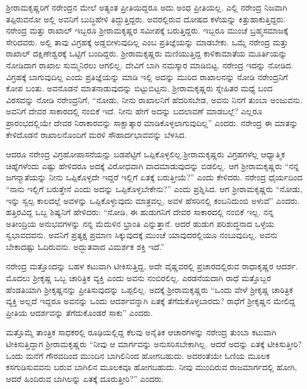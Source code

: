 ಶ‍್ರೀರಾಮಕೃಷ್ಣರಿಗೆ ನರೇಂದ್ರನ ಮೇಲೆ ಅತ್ಯಂತ ಪ್ರೀತಿಯಿದ್ದರೂ ಅದು ಅಂಧ ಪ್ರೀತಿಯಲ್ಲ. ಎಲ್ಲಿ ನರೇಂದ್ರ ನಿಜವಾಗಿ ತಪ್ಪಿರುವನೋ ಅಲ್ಲಿ ಅವನಿಗೆ ಬುದ್ಧಿಹೇಳಿ ತಿದ್ದುತ್ತಿದ್ದರು. ಅವರಲ್ಲಿರುವ ದೋಷದ ಕಳೆಯನ್ನು ಕಿತ್ತುಹಾಕುತ್ತಿದ್ದರು. ನರೇಂದ್ರ ಮತ್ತು ರಾಖಾಲ್ ಇಬ್ಬರೂ ಶ‍್ರೀರಾಮಕೃಷ್ಣರ ಸಮೀಪಕ್ಕೆ ಬರುತ್ತಿದ್ದರು. ಇಬ್ಬರೂ ಮುಂಚೆ ಬ್ರಹ್ಮಸಮಾಜಕ್ಕೆ ಸೇರಿದವರು. ಅಲ್ಲಿ ತಾವು ವಿಗ್ರಹಕ್ಕೆ ಅಡ್ಡಬೀಳುವುದಿಲ್ಲ ಎಂಬ ಪ್ರತಿಜ್ಞೆಯನ್ನು ಮಾಡಬೇಕು. ಒಮ್ಮೆ ನರೇಂದ್ರ ಮತ್ತು ರಾಖಾಲ್ ದಕ್ಷಿಣೇಶ್ವರಕ್ಕೆ ಒಟ್ಟಿಗೆ ಬಂದಿದ್ದರು. ಶ‍್ರೀರಾಮಕೃಷ್ಣರು ಮಣಿಯುತ್ತಿದ್ದ ಕಾಳಿಕಾಮಾತೆಯ ಮೂರ್ತಿಯನ್ನು ನೋಡಿದಾಗ ರಾಖಾಲ ಸುಮ್ಮನಿರಲು ಆಗಲಿಲ್ಲ. ದೇವಿಗೆ ಬಾಗಿ ನಮಸ್ಕಾರ ಮಾಡಿಬಿಟ್ಟ. ನರೇಂದ್ರ ಇದನ್ನು ನೋಡಿದ. ವಿಗ್ರಹಕ್ಕೆ ಬಾಗುವುದಿಲ್ಲ ಎಂದು ಪ್ರತಿಜ್ಞೆಯನ್ನು ಮಾಡಿ ಇಲ್ಲಿ ಅದನ್ನು ಮುರಿದ ರಾಖಾಲನನ್ನು ನೋಡಿ ನರೇಂದ್ರನಿಗೆ ಕೋಪ ಬಂತು. ಅವನೊಡನೆ ಮಾತನಾಡುವುದನ್ನು ಬಿಟ್ಟುಬಿಟ್ಟನು. ಶ‍್ರೀರಾಮಕೃಷ್ಣರು ಸ್ನೇಹಿತರ ಮಧ್ಯೆ ಬಂದ ವಿರಸವನ್ನು ನೋಡಿ ನರೇಂದ್ರನಿಗೆ, “ನೋಡು, ನೀನು ರಾಖಾಲನಿಗೆ ಹೆದರಿಸಬೇಡ, ಅವನು ನಿನಗೆ ತುಂಬಾ ಅಂಜುವನು. ಅವನಿಗೆ ದೇವರ ಸಾಕಾರದಲ್ಲಿ ನಂಬಿಕೆ ಇದೆ. ನೀನು ಹೇಗೆ ಅದನ್ನು ಬದಲಾವಣೆ ಮಾಡಬಲ್ಲೆ? ಎಲ್ಲರೂ ಪ್ರಾರಂಭದಲ್ಲಿಯೇ ದೇವರ ನಿರಾಕಾರವನ್ನು ಸಾಕ್ಷಾತ್ಕಾರ ಮಾಡಿಕೊಳ್ಳಲಾಗುವುದಿಲ್ಲ” ಎಂದರು. ನರೇಂದ್ರ ಈ ಮಾತನ್ನು ಕೇಳಿದೊಡನೆ ರಾಖಾಲನೊಂದಿಗೆ ಮರಳಿ ಸೌಹಾರ್ದಭಾವವನ್ನು ಬೆಳಸಿದ.

ಆದರೂ ನರೇಂದ್ರ ವಿಗ್ರಹೋಪಾಸನೆಯನ್ನು ಬಡಪೆಟ್ಟಿಗೆ ಒಪ್ಪಿಕೊಳ್ಳಲಿಲ್ಲ.\break ಶ‍್ರೀರಾಮಕೃಷ್ಣರು ವಿಗ್ರಹಗಳೆಲ್ಲ ಆಧ್ಯಾತ್ಮಿಕ ಚಿಹ್ನೆಗಳೆಂದು ಎಷ್ಟು ಹೇಳಿದರೂ ಅದಕ್ಕೆ ವಿರೋಧವಾಗಿ ವಾದಮಾಡುವುದನ್ನು ಬಿಡಲಿಲ್ಲ. ಆಗ ಶ‍್ರೀರಾಮಕೃಷ್ಣರು “ನನ್ನ ಜಗನ್ಮಾತೆಯನ್ನು ನೀನು ಒಪ್ಪಿಕೊಳ್ಳದೇ ಇದ್ದರೆ ಇಲ್ಲಿಗೆ ಏತಕ್ಕೆ ಬರುತ್ತೀಯೆ?” ಎಂದು ಕೇಳಿದರು. ನರೇಂದ್ರ ಧೈರ್ಯದಿಂದ “ನಾನು ಇಲ್ಲಿಗೆ ಬರುತ್ತೇನೆ ಎಂದು ಅದನ್ನು ಒಪ್ಪಿಕೊಳ್ಳಬೇಕೇನು?” ಎಂದು ಪ್ರಶ್ನಿಸಿದ. ಆಗ ಶ‍್ರೀರಾಮಕೃಷ್ಣರು “ನೋಡು, ಇನ್ನು ಸ್ವಲ್ಪ ಕಾಲದಲ್ಲೆ ಅವಳನ್ನು ಒಪ್ಪಿಕೊಳ್ಳುವುದು ಮಾತ್ರವಲ್ಲ, ಅವಳ ಹೆಸರಿನಲ್ಲಿ ಕಂಬನಿದುಂಬಿ ಅಳುವೆ” ಎಂದರು. ಹತ್ತಿರವಿದ್ದ ಒಬ್ಬ ಶಿಷ್ಯನಿಗೆ ಹೇಳಿದರು: “ನೋಡಿ, ಈ ಹುಡುಗನಿಗೆ ದೇವರ ಸಾಕಾರದಲ್ಲಿ ನಂಬಿಕೆ ಇಲ್ಲ. ನನ್ನ ಅತೀಂದ್ರಿಯ ಅನುಭವಗಳನ್ನು ನನ್ನ ಮೆದುಳಿನ ಭ್ರಾಂತಿ ಎನ್ನುತ್ತಾನೆ. ಆದರೆ ಹುಡುಗ ಪರಿಶುದ್ಧನಾದ ಒಳ್ಳೆಯ ಸ್ವಭಾವದವನು. ಅವನಿಗೆ ಪ್ರತ್ಯಕ್ಷ ಪ್ರಮಾಣ ಸಿಕ್ಕುವುದಕ್ಕೆ ಮುಂಚೆ ಯಾವುದರಲ್ಲಿಯೂ ನಂಬುವುದಿಲ್ಲ. ಅವನು ಬೇಕಾದಷ್ಟು ಓದಿರುವನು. ಅದ್ಭುತವಾದ ವಿಮರ್ಶಕ ಶಕ್ತಿ ಇದೆ.”

ನರೇಂದ್ರ ಮತ್ತೊಂದನ್ನು ಬಹಳ ಕಟುವಾಗಿ ಟೀಕಿಸುತ್ತಿದ್ದ, ಅದೇ ವೈಷ್ಣವರಲ್ಲಿ ಪ್ರಚಾರದಲ್ಲಿರುವ ರಾಧಾಕೃಷ್ಣರ ಆದರ್ಶ. ಮೊದಲು ಶ‍್ರೀಕೃಷ್ಣ ಒಬ್ಬ ಚಾರಿತ್ರಿಕ ವ್ಯಕ್ತಿ ಎಂದು ಅವನು ನಂಬಿರಲಿಲ್ಲ. ಎರಡನೆಯದಾಗಿ ರಾಧೆ ಮತ್ತೊಬ್ಬರ ಹೆಂಡತಿಯಾಗಿ ಶ‍್ರೀಕೃಷ್ಣನನ್ನು ಪ್ರೀತಿಸುವುದನ್ನು ಒಪ್ಪಲಿಲ್ಲ. ಅದಕ್ಕೆ ಶ‍್ರೀರಾಮಕೃಷ್ಣರು “ಒಂದು ವೇಳೆ ಶ‍್ರೀಕೃಷ್ಣ ಚಾರಿತ್ರಿಕ ವ್ಯಕ್ತಿ ಅಲ್ಲದೆ ಇದ್ದರೂ ಅವನನ್ನು ಒಂದು ಆದರ್ಶವನ್ನಾಗಿ ಏತಕ್ಕೆ ತೆಗೆದುಕೊಳ್ಳಬಾರದು? ರಾಧೆಗೆ ಶ‍್ರೀಕೃಷ್ಣನ ಮೇಲಿದ್ದ ಪ್ರೀತಿಯ ಆದರ್ಶವನ್ನು ತೆಗೆದುಕೊಂಡರೆ ಸಾಕು” ಎಂದರು.

ಮತ್ತೊಮ್ಮೆ ತಾಂತ್ರಿಕ ಸಾಧಕರಲ್ಲಿ ರೂಢಿಯಲ್ಲಿದ್ದ ಕೆಲವು ಅನೈತಿಕ ಆಚಾರಗಳನ್ನು ನರೇಂದ್ರ ತುಂಬಾ ಕಟುವಾಗಿ ಟೀಕಿಸುತ್ತಿದ್ದಾಗ ಶ‍್ರೀರಾಮಕೃಷ್ಣರು “ನೀವು ಆ ಮಾರ್ಗವನ್ನು ಅನುಸರಿಸಬೇಕಾಗಿಲ್ಲ. ಆದರೆ ಅದನ್ನು ಏತಕ್ಕೆ ಟೀಕಿಸುತ್ತೀರಿ? ಒಂದು ಮನೆಗೆ ಗೌರವದಿಂದ ಮುಂದಿನ ಬಾಗಿಲಿನಿಂದ ಹೋಗಬಹುದು. ಅದರಂತೆಯೇ ಓಣಿಯ ಮೂಲಕ ಕಸಗುಡಿಸುವವನು ಬರುವ ಬಾಗಿಲಿನ ಮೂಲಕವೂ ಹೋಗಬಹುದು. ನೀವು ಮುಂದಿರುವ ರಾಜಮಾರ್ಗದಲ್ಲಿ ಹೋಗಿ, ಆದರೆ ಹಿಂದಿರುವ ಬಾಗಿಲನ್ನು ಏತಕ್ಕೆ ದೂರುತ್ತೀರಿ?” ಎಂದರು.

